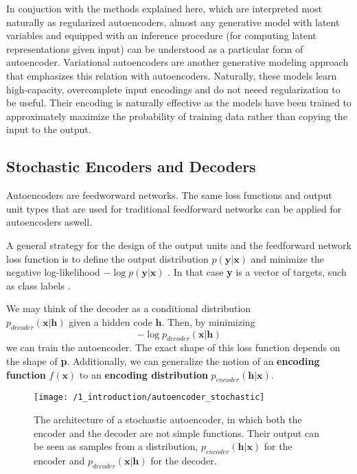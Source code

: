 In conjuction with the methods explained here, which are interpreted most
naturally as regularized autoencoders, almost any generative model with latent
variables and equipped with an inference procedure (for computing latent
representations given input) can be understood as a particular form of
autoencoder. Variational autoencoders are another generative modeling approach
that emphasizes this relation with autoencoders. Naturally, these models learn
high-capacity, overcomplete input encodings and do not neeed regularization to
be useful. Their encoding is naturally effective as the models have been trained
to approximately maximize the probability of training data rather than copying
the input to the output. 

\subsection{Stochastic Encoders and Decoders}
Autoencoders are feedworward networks. The same loss functions and output unit
types that are used for traditional feedforward networks can be applied for
autoencoders aswell.

A general strategy for the design of the output units and the feedforward
network loss function is to define the output distribution
$p(\textbf{y}|\textbf{x})$ and minimize the negative log-likelihood $-\log
p(\textbf{y}|\textbf{x})$ . In that case \textbf{y} is a vector of targets, such
as class labels \cite{werbos2002stochastic}.

We may think of the decoder as a conditional distribution \\
$p_{decoder}(\textbf{x}|\textbf{h})$ given a hidden code $\textbf{h}$. Then, by
minimizing 
\begin{equation}
    -\log p_{decoder}(\textbf{x}|\textbf{h})
\end{equation}
we can train the autoencoder. The exact shape of this loss function depends on
the shape of \textbf{p}. Additionally, we can generalize the notion of an
\textbf{encoding function} $f(\textbf{x})$ to an \textbf{encoding distribution}
$p_{encoder}(\textbf{h}|\textbf{x})$.

\begin{figure}
	\centering
	\texttt{[image: /1\_introduction/autoencoder\_stochastic]}
    \caption{The architecture of a stochastic autoencoder, in which both the
    encoder and the decoder are not simple functions. Their output can be seen
    as samples from a distribution, $p_{encoder}(\textbf{h}|\textbf{x})$ for the
    encoder and $p_{decoder}(\textbf{x}|\textbf{h})$ for the decoder.}
\end{figure}

